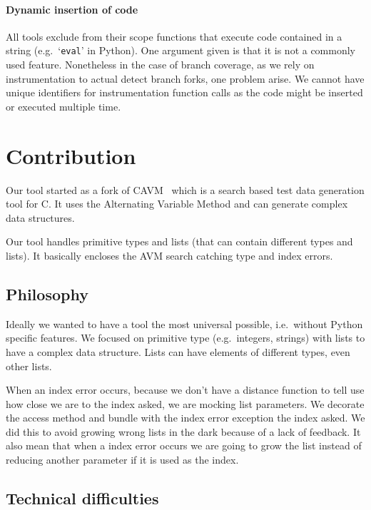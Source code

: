 \documentclass{llncs2e/llncs}
\begin{document}
\paragraph{Dynamic insertion of code} All tools exclude from their scope
functions that execute code contained in a string (e.g.\ `\texttt{eval}' in
Python). One argument given is that it is not a commonly used feature.
Nonetheless in the case of branch coverage, as we rely on instrumentation to
actual detect branch forks, one problem arise. We cannot have unique identifiers
for instrumentation function calls as the code might be inserted or executed
multiple time.


\section{Contribution}
\label{contribution}

Our tool started as a fork of CAVM~\cite{Kim2017ts} which is a search based test
data generation tool for C. It uses the Alternating Variable Method and can
generate complex data structures.

Our tool handles primitive types and lists (that can contain different types and
lists). It basically encloses the AVM search catching type and index errors.

\subsection{Philosophy}
\label{philosophy}

Ideally we wanted to have a tool the most universal possible, i.e.\ without
Python specific features. We focused on primitive type (e.g.\ integers, strings)
with lists to have a complex data structure. Lists can have elements of
different types, even other lists.

When an index error occurs, because we don't have a distance function to tell
use how close we are to the index asked, we are mocking list parameters. We
decorate the access method and bundle with the index error exception the index
asked. We did this to avoid growing wrong lists in the dark because of a lack of
feedback. It also mean that when a index error occurs we are going to grow the
list instead of reducing another parameter if it is used as the index.

\subsection{Technical difficulties}
\label{tech_difficulties}
\end{document}
